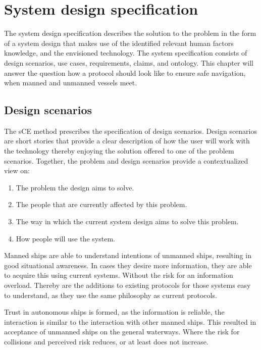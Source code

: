 \chapter{System design specification}
\label{ch:system-design}
The system design specification describes the solution to the problem in the form of a system design that makes use of the identified relevant human factors knowledge, and the envisioned technology. The system specification consists of design scenarios, use cases, requirements, claims, and ontology. This chapter will answer the question how a protocol should look like to ensure safe navigation, when manned and unmanned vessels meet.

\section{Design scenarios}
The sCE method prescribes the specification of design scenarios. Design scenarios are short stories that provide a clear description of how the user will work with the technology thereby enjoying the solution offered to one of the problem scenarios. Together, the problem and design scenarios provide a contextualized view on:
\begin{enumerate}
	\item The problem the design aims to solve.
	\item The people that are currently affected by this problem.
	\item The way in which the current system design aims to solve this problem.
	\item How people will use the system.
\end{enumerate}

Manned ships are able to understand intentions of unmanned ships, resulting in good situational awareness. In cases they desire more information, they are able to acquire this using current systems. Without the risk for an information overload. Thereby are the additions to existing protocols for those systems easy to understand, as they use the same philosophy as current protocols.

Trust in autonomous ships is formed, as the information is reliable, the interaction is similar to the interaction with other manned ships. This resulted in acceptance of unmanned ships on the general waterways. Where the risk for collisions and perceived risk reduces, or at least does not increase.

